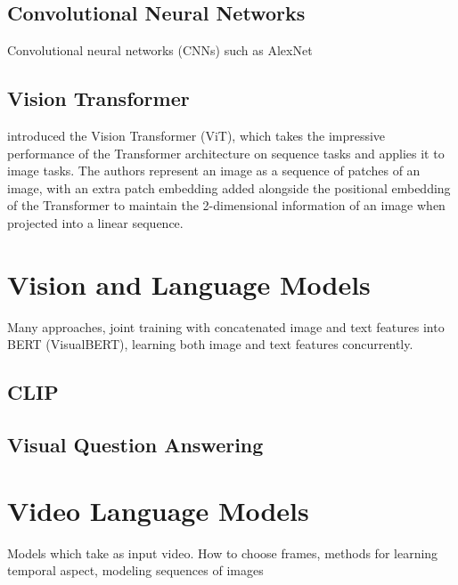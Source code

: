 \subsection{Convolutional Neural Networks}
\label{ssec:cnn}

Convolutional neural networks (CNNs) such as AlexNet~\citep{krizhevsky2012alexnet}

\subsection{Vision Transformer}
\label{ssec:vit}

\cite{dosovitskiy2021vit} introduced the Vision Transformer (ViT), which takes the impressive performance of the Transformer architecture on sequence tasks and applies it to image tasks. The authors represent an image as a sequence of patches of an image, with an extra patch embedding added alongside the positional embedding of the Transformer \cite{vaswani2017attention} to maintain the 2-dimensional information of an image when projected into a linear sequence. 

\section{Vision and Language Models}
\label{sec:vlm}

Many approaches, joint training with concatenated image and text features into BERT (VisualBERT), learning both image and text features concurrently.


\subsection{CLIP}
\label{ssec:clip}

\citep{radford2021clip}

\subsection{Visual Question Answering}
\label{ssec:vqa}

\section{Video Language Models}
\label{sec:vidlmi}

Models which take as input video. How to choose frames, methods for learning temporal aspect, modeling sequences of images

